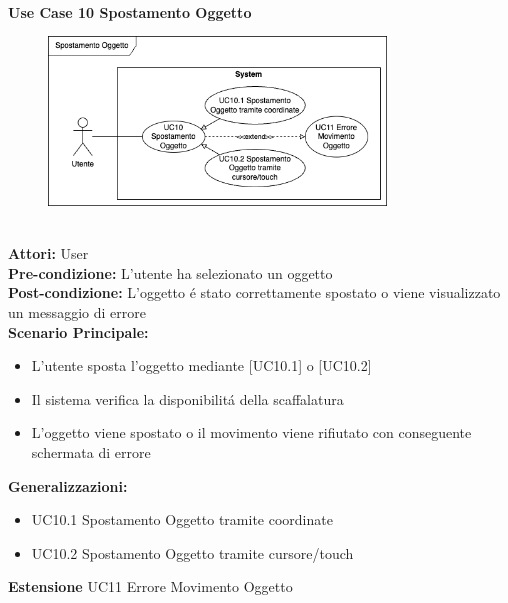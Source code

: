 \vspace{0.5cm}


\vspace{0.5cm}

\Large\textbf{}\\
\Large\textbf{Use Case 10 Spostamento Oggetto} \\
\begin{figure}[h]
 \centering
 \includegraphics[width=0.8\textwidth]{UseCasesImages/ObjMovement.drawio.png}
\end{figure}

\vspace{0.5cm}

\large\textbf{} \\
\textbf{Attori:} User\\
\textbf{Pre-condizione:} L'utente ha selezionato un oggetto \\
\textbf{Post-condizione: } L'oggetto é stato correttamente spostato o viene visualizzato un messaggio di errore\\
\textbf{Scenario Principale:} 
\begin{itemize}
    \item L'utente sposta l'oggetto mediante [UC10.1] o [UC10.2]
    \item Il sistema verifica la disponibilitá della scaffalatura
    \item L'oggetto viene spostato o il movimento viene rifiutato con conseguente schermata di errore
\end{itemize}
\textbf{Generalizzazioni:}
\begin{itemize}
    \item UC10.1 Spostamento Oggetto tramite coordinate
    \item UC10.2 Spostamento Oggetto tramite cursore/touch
\end{itemize}
\textbf{Estensione} UC11 Errore Movimento Oggetto

\vspace{0.5cm}

